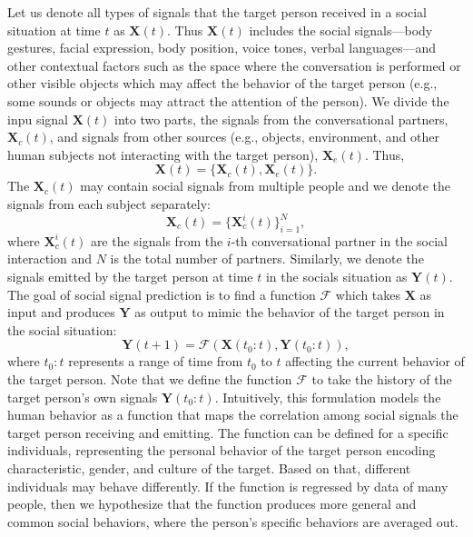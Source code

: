 Let us denote all types of signals that the target person received in a social situation at time $t$ as $\mathbf{X}(t)$. Thus $\mathbf{X}(t)$ includes the social signals---body gestures, facial expression, body position, voice tones, verbal languages---and other contextual factors such as the space where the conversation is performed or other visible objects which may affect the behavior of the target person (e.g., some sounds or objects may attract the attention of the person). We divide the inpu signal $\mathbf{X}(t)$ into two parts, the signals from the conversational partners, $\mathbf{X}_c(t)$, and signals from other sources (e.g., objects, environment, and other human subjects not interacting with the target person), $\mathbf{X}_e(t)$.  Thus,
\begin{equation}
\mathbf{X} (t) = \{  \mathbf{X}_c (t), \mathbf{X}_e (t)\}.
\end{equation}
The $\mathbf{X}_c (t)$ may contain social signals from multiple people and we denote the signals from each subject separately:
\begin{equation}
\mathbf{X}_c (t) = \{ \mathbf{X}_c^i (t) \}_{i=1}^N,
\end{equation}
where $\mathbf{X}^i_c (t)$ are the signals from the $i$-th conversational partner in the social interaction and $N$ is the total number of partners. 
Similarly, we denote the signals emitted by the target person at time $t$ in the socials situation as $\mathbf{Y} (t)$.
The goal of social signal prediction is to find a function $\mathcal{F}$ which takes $\mathbf{X}$ as input and produces $\mathbf{Y}$ as output to mimic the behavior of the target person in the social situation:
\begin{equation}
\mathbf{Y} (t+1) = \mathcal{F} \left( \mathbf{X} (t_0:t), \mathbf{Y} (t_0:t) \right),
\label{equation:socialPrediction_1}
\end{equation}
where $t_0:t$ represents a range of time from $t_0$ to $t$ affecting the current behavior of the target person. Note that we define the function $\mathcal{F}$ to take the history of the target person's own signals $\mathbf{Y} (t_0:t)$. Intuitively, this formulation models the human behavior as a function that maps the correlation among social signals the target person receiving and emitting. The function can be defined for a specific individuals, representing the personal behavior of the target person encoding characteristic, gender, and culture of the target. Based on that, different individuals may behave differently. If the function is regressed by data of many people, then we hypothesize that the function produces more general and common social behaviors, where the person's specific behaviors are averaged out.

